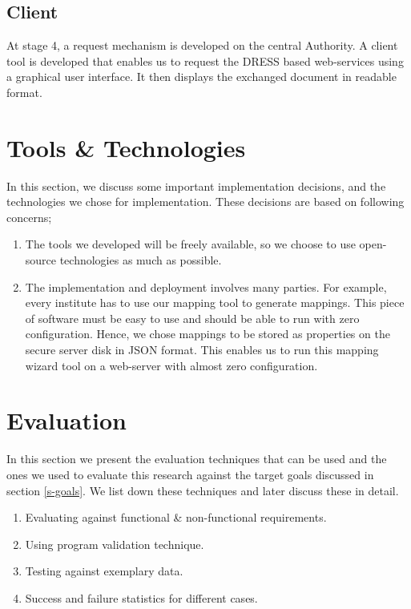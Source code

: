 \documentclass[12pt,a4paper,oneside]{book}
\begin{document}
\subsection{Client}
At stage 4, a request mechanism is developed on the central Authority. A client tool is developed that enables us to request the DRESS based web-services using a graphical user interface. It then displays the exchanged document in readable format.

\section{Tools \& Technologies}
In this section, we discuss some important implementation decisions, and the technologies we chose for implementation. These decisions are based on following concerns;

\begin{enumerate}

\item The tools we developed will be freely available, so we choose to use open-source technologies as much as possible.

\item The implementation and deployment involves many parties. For example, every institute has to use our mapping tool to generate mappings. This piece of software must be easy to use and should be able to run with zero configuration. Hence, we chose mappings to be stored as properties on the secure server disk in JSON format. This enables us to run this mapping wizard tool on a web-server with almost zero configuration.	

\end{enumerate}

\section{Evaluation}
In this section we present the evaluation techniques that can be used and the ones we used to evaluate this research against the target goals discussed in section \ref{s-goals}. We list down these techniques and later discuss these in detail.

	\begin{enumerate}

	\item Evaluating against functional \& non-functional requirements.

	\item Using program validation technique.
	
	\item Testing against exemplary data.
	
	\item Success and failure statistics for different cases.	

	\end{enumerate}
	
\end{document}
